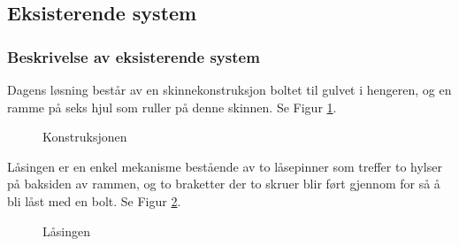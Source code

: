 \subsection{Eksisterende system}
\subsubsection{Beskrivelse av eksisterende system}

Dagens løsning består av en skinnekonstruksjon boltet til gulvet i hengeren, og en ramme på seks hjul som ruller på denne skinnen. Se Figur \ref{F1}.
\begin{figure}[H]
\centering   
{}
\caption{Konstruksjonen}
\label{F1}
\end{figure}

Låsingen er en enkel mekanisme bestående av to låsepinner som treffer to hylser på baksiden av rammen, og to braketter der to skruer blir ført gjennom for så å bli låst med en bolt. Se Figur \ref{F2}.

\begin{figure}[H]
\centering   
{}
\caption{Låsingen}
\label{F2}
\end{figure}

